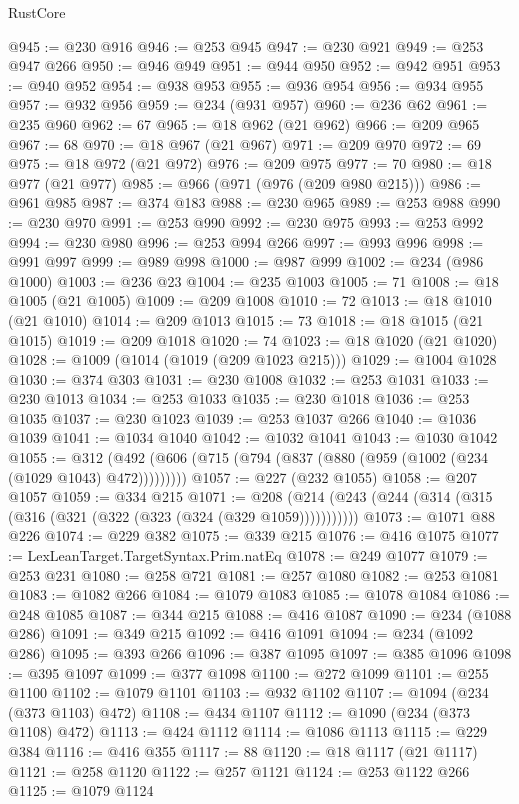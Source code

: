 \begin{lexlean}{RustCore}
\begin{coremodule}
@945 := @230 @916
@946 := @253 @945
@947 := @230 @921
@949 := @253 @947 @266
@950 := @946 @949
@951 := @944 @950
@952 := @942 @951
@953 := @940 @952
@954 := @938 @953
@955 := @936 @954
@956 := @934 @955
@957 := @932 @956
@959 := @234 (@931 @957)
@960 := @236 @62
@961 := @235 @960
@962 := 67
@965 := @18 @962 (@21 @962)
@966 := @209 @965
@967 := 68
@970 := @18 @967 (@21 @967)
@971 := @209 @970
@972 := 69
@975 := @18 @972 (@21 @972)
@976 := @209 @975
@977 := 70
@980 := @18 @977 (@21 @977)
@985 := @966 (@971 (@976 (@209 @980 @215)))
@986 := @961 @985
@987 := @374 @183
@988 := @230 @965
@989 := @253 @988
@990 := @230 @970
@991 := @253 @990
@992 := @230 @975
@993 := @253 @992
@994 := @230 @980
@996 := @253 @994 @266
@997 := @993 @996
@998 := @991 @997
@999 := @989 @998
@1000 := @987 @999
@1002 := @234 (@986 @1000)
@1003 := @236 @23
@1004 := @235 @1003
@1005 := 71
@1008 := @18 @1005 (@21 @1005)
@1009 := @209 @1008
@1010 := 72
@1013 := @18 @1010 (@21 @1010)
@1014 := @209 @1013
@1015 := 73
@1018 := @18 @1015 (@21 @1015)
@1019 := @209 @1018
@1020 := 74
@1023 := @18 @1020 (@21 @1020)
@1028 := @1009 (@1014 (@1019 (@209 @1023 @215)))
@1029 := @1004 @1028
@1030 := @374 @303
@1031 := @230 @1008
@1032 := @253 @1031
@1033 := @230 @1013
@1034 := @253 @1033
@1035 := @230 @1018
@1036 := @253 @1035
@1037 := @230 @1023
@1039 := @253 @1037 @266
@1040 := @1036 @1039
@1041 := @1034 @1040
@1042 := @1032 @1041
@1043 := @1030 @1042
@1055 := @312 (@492 (@606 (@715 (@794 (@837 (@880 (@959 (@1002 (@234 (@1029 @1043) @472)))))))))
@1057 := @227 (@232 @1055)
@1058 := @207 @1057
@1059 := @334 @215
@1071 := @208 (@214 (@243 (@244 (@314 (@315 (@316 (@321 (@322 (@323 (@324 (@329 @1059)))))))))))
@1073 := @1071 @88 @226
@1074 := @229 @382
@1075 := @339 @215
@1076 := @416 @1075
@1077 := LexLeanTarget.TargetSyntax.Prim.natEq
@1078 := @249 @1077
@1079 := @253 @231
@1080 := @258 @721
@1081 := @257 @1080
@1082 := @253 @1081
@1083 := @1082 @266
@1084 := @1079 @1083
@1085 := @1078 @1084
@1086 := @248 @1085
@1087 := @344 @215
@1088 := @416 @1087
@1090 := @234 (@1088 @286)
@1091 := @349 @215
@1092 := @416 @1091
@1094 := @234 (@1092 @286)
@1095 := @393 @266
@1096 := @387 @1095
@1097 := @385 @1096
@1098 := @395 @1097
@1099 := @377 @1098
@1100 := @272 @1099
@1101 := @255 @1100
@1102 := @1079 @1101
@1103 := @932 @1102
@1107 := @1094 (@234 (@373 @1103) @472)
@1108 := @434 @1107
@1112 := @1090 (@234 (@373 @1108) @472)
@1113 := @424 @1112
@1114 := @1086 @1113
@1115 := @229 @384
@1116 := @416 @355
@1117 := 88
@1120 := @18 @1117 (@21 @1117)
@1121 := @258 @1120
@1122 := @257 @1121
@1124 := @253 @1122 @266
@1125 := @1079 @1124

\end{coremodule}
\end{lexlean}
